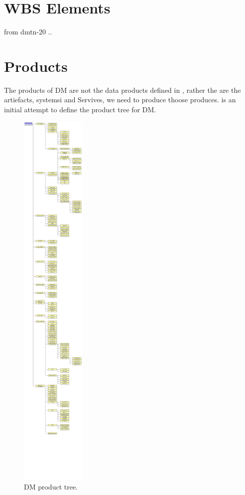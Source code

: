 \section{WBS Elements } \label{sect:WBS}

from dmtn-20 ..


\section {Products} \label{sect:products}

The products of DM are not the data products defined in , rather the are the artiefacts, systemsi and Servives,  we need to produce thoose produces.  is an initial attempt to define the product tree for DM. 

\begin{figure}[htbp]
\begin{center}
 \includegraphics[height=19cm]{ProductTree}
\caption{DM product tree. \label{fig:prods}}
\end{center}
\end{figure}

